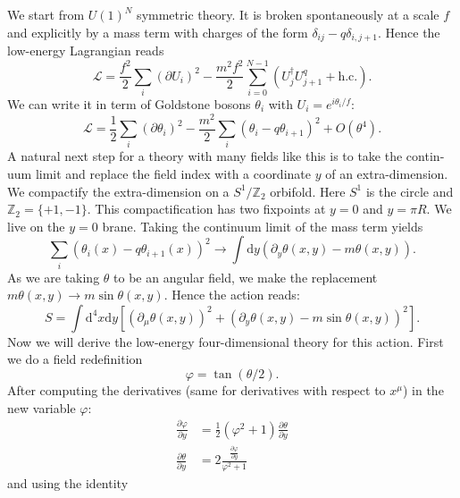 \documentclass[master,       %
               twoside,        %
               BCOR10mm,       %
               english,ngerman, %
               ]{GAUBM}
\begin{document}
\begin{otherlanguage}{english}
We start from $U(1)^N$ symmetric theory. It is broken spontaneously at a scale $f$ and explicitly by a mass term with charges of the form $\delta_{ij} - q \delta_{i,j+1}$. Hence the low-energy Lagrangian reads
\begin{equation}
	\mathcal{L} = \frac{f^2}{2} \sum_i (\partial U_i)^2 - \frac{m^2 f^2}{2} \sum_{i = 0}^{N - 1} (U_j^\dagger U^q_{j + 1} + \mathrm{h.c.}).
\end{equation}
We can write it in term of Goldstone bosons $\theta_i$ with $U_i = e^{i \theta_i/ f}$:
\begin{equation}
	\mathcal{L} = \frac{1}{2} \sum_i (\partial \theta_i)^2 - \frac{m^2}{2} \sum_i (\theta_i - q \theta_{i + 1})^2 + O(\theta^4).
\end{equation}
A natural next step for a theory with many fields like this is to take the continuum limit and replace the field index with a coordinate $y$ of an extra-dimension.
We compactify the extra-dimension on a $S^1 / \mathbb{Z}_2$ orbifold. Here $S^1$ is the circle and $\mathbb{Z}_2 = \{+1, -1\}$. This compactification has two fixpoints at $y = 0$ and $y = \pi R$. We live on the $y = 0$ brane.
Taking the continuum limit of the mass term yields
\begin{equation}
	\sum_i (\theta_i(x) - q \theta_{i + 1}(x))^2 \to \int \mathrm{d} y (\partial_y \theta(x, y) - m \theta(x, y) ).
\end{equation}
As we are taking $\theta$ to be an angular field, we make the replacement $m \theta(x, y) \to m \sin \theta(x, y)$.
Hence the action reads:
\begin{equation}
	S = \int \mathrm{d}^4 x \mathrm{d} y \left[ (\partial_\mu \theta(x, y))^2 + (\partial_y \theta(x, y) - m \sin \theta(x, y))^2 \right].
\end{equation}
Now we will derive the low-energy four-dimensional theory for this action.
First we do a field redefinition
\begin{equation}
	\varphi = \tan ( \theta / 2 ).
\end{equation}
After computing the derivatives (same for derivatives with respect to $x^\mu$) in the new variable $\varphi$:
\begin{align}
	\frac{\partial \varphi}{\partial y} &= \frac{1}{2} (\varphi^2 + 1) \frac{\partial \theta}{\partial y} \nonumber \\
	\frac{\partial \theta}{\partial y} &= 2 \frac{\frac{\partial \varphi}{\partial y}}{\varphi^2 + 1}
\end{align}
and using the identity
\begin{equation}

\end{equation}
\end{otherlanguage}
\end{document}
